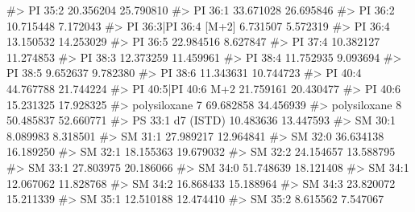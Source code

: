 \documentclass[
  letterpaper,
  DIV=11,
  numbers=noendperiod]{scrreprt}
\newenvironment{Shaded}{\begin{snugshade}}{\end{snugshade}}
\newcommand{\CommentTok}[1]{\textcolor[rgb]{0.37,0.37,0.37}{#1}}
\begin{document}
\begin{Shaded}
\begin{Highlighting}[]
\CommentTok{\#\textgreater{} PI 35:2                                   20.356204 25.790810}
\CommentTok{\#\textgreater{} PI 36:1                                   33.671028 26.695846}
\CommentTok{\#\textgreater{} PI 36:2                                   10.715448  7.172043}
\CommentTok{\#\textgreater{} PI 36:3|PI 36:4 [M+2]                      6.731507  5.572319}
\CommentTok{\#\textgreater{} PI 36:4                                   13.150532 14.253029}
\CommentTok{\#\textgreater{} PI 36:5                                   22.984516  8.627847}
\CommentTok{\#\textgreater{} PI 37:4                                   10.382127 11.274853}
\CommentTok{\#\textgreater{} PI 38:3                                   12.373259 11.459961}
\CommentTok{\#\textgreater{} PI 38:4                                   11.752935  9.093694}
\CommentTok{\#\textgreater{} PI 38:5                                    9.652637  9.782380}
\CommentTok{\#\textgreater{} PI 38:6                                   11.343631 10.744723}
\CommentTok{\#\textgreater{} PI 40:4                                   44.767788 21.744224}
\CommentTok{\#\textgreater{} PI 40:5|PI 40:6 M+2                       21.759161 20.430477}
\CommentTok{\#\textgreater{} PI 40:6                                   15.231325 17.928325}
\CommentTok{\#\textgreater{} polysiloxane 7                            69.682858 34.456939}
\CommentTok{\#\textgreater{} polysiloxane 8                            50.485837 52.660771}
\CommentTok{\#\textgreater{} PS 33:1 d7 (ISTD)                         10.483636 13.447593}
\CommentTok{\#\textgreater{} SM 30:1                                    8.089983  8.318501}
\CommentTok{\#\textgreater{} SM 31:1                                   27.989217 12.964841}
\CommentTok{\#\textgreater{} SM 32:0                                   36.634138 16.189250}
\CommentTok{\#\textgreater{} SM 32:1                                   18.155363 19.679032}
\CommentTok{\#\textgreater{} SM 32:2                                   24.154657 13.588795}
\CommentTok{\#\textgreater{} SM 33:1                                   27.803975 20.186066}
\CommentTok{\#\textgreater{} SM 34:0                                   51.748639 18.121408}
\CommentTok{\#\textgreater{} SM 34:1                                   12.067062 11.828768}
\CommentTok{\#\textgreater{} SM 34:2                                   16.868433 15.188964}
\CommentTok{\#\textgreater{} SM 34:3                                   23.820072 15.211339}
\CommentTok{\#\textgreater{} SM 35:1                                   12.510188 12.474410}
\CommentTok{\#\textgreater{} SM 35:2                                    8.615562  7.547067}

\end{Highlighting}
\end{Shaded}
\end{document}
